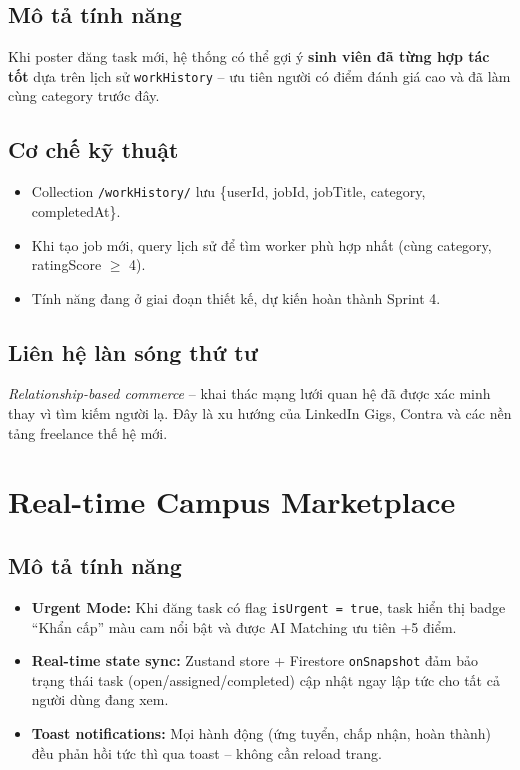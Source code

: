\subsection*{Mô tả tính năng}

Khi poster đăng task mới, hệ thống có thể gợi ý \textbf{sinh viên đã từng hợp tác tốt}
dựa trên lịch sử \texttt{workHistory} -- ưu tiên người có điểm đánh giá cao và đã làm
cùng category trước đây.

\subsection*{Cơ chế kỹ thuật}

\begin{itemize}
  \item Collection \texttt{/workHistory/} lưu \{userId, jobId, jobTitle, category, completedAt\}.
  \item Khi tạo job mới, query lịch sử để tìm worker phù hợp nhất (cùng category,
    ratingScore $\geq$ 4).
  \item Tính năng đang ở giai đoạn thiết kế, dự kiến hoàn thành Sprint 4.
\end{itemize}

\subsection*{Liên hệ làn sóng thứ tư}

\textit{Relationship-based commerce} -- khai thác mạng lưới quan hệ đã được xác minh
thay vì tìm kiếm người lạ. Đây là xu hướng của LinkedIn Gigs, Contra và các nền tảng
freelance thế hệ mới.

\section{Real-time Campus Marketplace}

\subsection*{Mô tả tính năng}

\begin{itemize}
  \item \textbf{Urgent Mode:} Khi đăng task có flag \texttt{isUrgent = true}, task
    hiển thị badge ``Khẩn cấp'' màu cam nổi bật và được AI Matching ưu tiên +5 điểm.
  \item \textbf{Real-time state sync:} Zustand store + Firestore \texttt{onSnapshot}
    đảm bảo trạng thái task (open/assigned/completed) cập nhật ngay lập tức cho tất cả
    người dùng đang xem.
  \item \textbf{Toast notifications:} Mọi hành động (ứng tuyển, chấp nhận, hoàn thành)
    đều phản hồi tức thì qua toast -- không cần reload trang.
\end{itemize}

